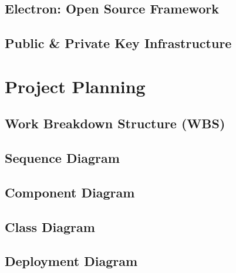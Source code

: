 \documentclass[12pt]{article}
\begin{document}
	\subsection{Electron: Open Source Framework}
		\lipsum[1]
	\subsection{Public \& Private Key Infrastructure}
		\lipsum[1]
\pagebreak
\section{Project Planning}
	\lipsum[1]
	\pagebreak
	\subsection{Work Breakdown Structure (WBS)}
	\lipsum[1]
	\pagebreak
	\subsection{Sequence Diagram}
	\lipsum[1]
	\pagebreak
	\subsection{Component Diagram}
	\lipsum[1]
	\pagebreak
	\subsection{Class Diagram}
	\lipsum[1]
	\pagebreak
	\subsection{Deployment Diagram}
	\lipsum[1]
\pagebreak


\end{document}

